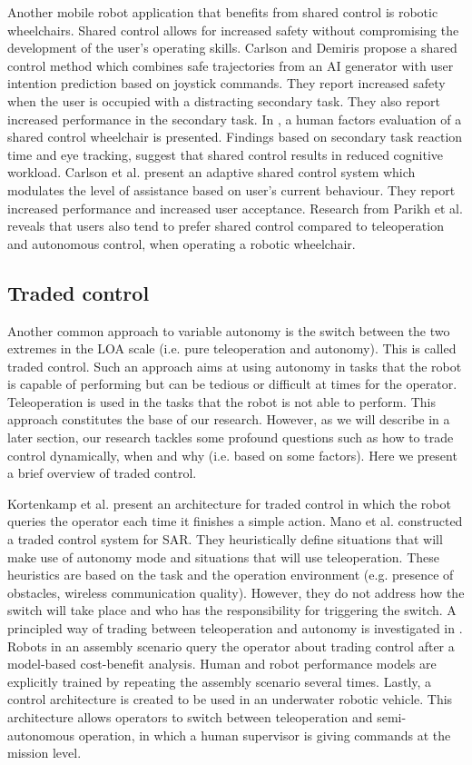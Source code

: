 \documentclass[a4paper,12pt,oneside,openright]{bhamthesis}
\begin{document}
Another mobile robot application that benefits from shared control is robotic wheelchairs. Shared control allows for increased safety without compromising the development of the user's operating skills. Carlson and Demiris \cite{Carlson2010} propose a shared control method which combines safe trajectories from an AI generator with user intention prediction based on joystick commands. They report increased safety when the user is occupied with a distracting secondary task. They also report increased performance in the secondary task. In \cite{Carlson2012}, a human factors evaluation of a shared control wheelchair is presented. Findings based on secondary task reaction time and eye tracking, suggest that shared control results in reduced cognitive workload. Carlson et al. \cite{Carlson2012a} present an adaptive shared control system which modulates the level of assistance based on user's current behaviour. They report increased performance and increased user acceptance. Research from Parikh et al. \cite{Parikh2005} reveals that users also tend to prefer shared control compared to teleoperation and autonomous control, when operating a robotic wheelchair.

\subsection{Traded control}
Another common approach to variable autonomy is the switch between the two extremes in the LOA scale (i.e. pure teleoperation and autonomy). This is called traded control. Such an approach aims at using autonomy in tasks that the robot is capable of performing but can be tedious or difficult at times for the operator. Teleoperation is used in the tasks that the robot is not able to perform. This approach constitutes the base of our research. However, as we will describe in a later section, our research tackles some profound questions such as how to trade control dynamically, when and why (i.e. based on some factors). Here we present a brief overview of traded control.

Kortenkamp et al. \cite{Kortenkamp2000} present an architecture for traded control in which the robot queries the operator each time it finishes a simple action. Mano et al. \cite{Mano2009} constructed a traded control system for SAR. They heuristically define situations that will make use of autonomy mode and situations that will use teleoperation. These heuristics are based on the task and the operation environment (e.g. presence of obstacles, wireless communication quality). However, they do not address how the switch will take place and who has the responsibility for triggering the switch. A principled way of trading between teleoperation and autonomy is investigated in \cite{Sellner2005}. Robots in an assembly scenario query the operator about trading control after a model-based cost-benefit analysis. Human and robot performance models are explicitly trained by repeating the assembly scenario several times. Lastly, a control architecture is created \cite{Kim2004} to be used in an underwater robotic vehicle. This architecture allows operators to switch between teleoperation and semi-autonomous operation, in which a human supervisor is giving commands at the mission level.
\end{document}
